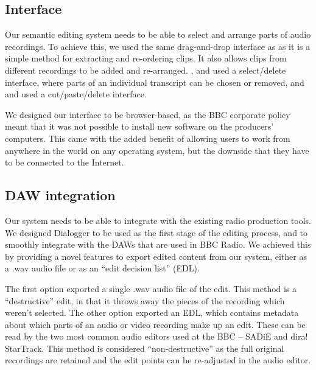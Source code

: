 
\subsection{Interface}

Our semantic editing system needs to be able to select and arrange parts of audio recordings. To achieve this, we used
the same drag-and-drop interface as \citet{Hyperaudio2016} as it is a simple method for extracting and re-ordering
clips. It also allows clips from different recordings to be added and re-arranged. \citet{Casares2002},
\citet{Sivaraman2016} and \citet{Berthouzoz2012} used a select/delete interface, where parts of an individual
transcript can be chosen or removed, and \citet{Whittaker2004} and \citet{Rubin2013} used a cut/paste/delete interface.

We designed our interface to be browser-based, as the BBC corporate policy meant that it was not possible to install
new software on the producers' computers. This came with the added benefit of allowing users to work from anywhere in
the world on any operating system, but the downside that they have to be connected to the Internet.

\subsection{DAW integration}

Our system needs to be able to integrate with the existing radio production tools. We designed Dialogger to be used as
the first stage of the editing process, and to smoothly integrate with the DAWs that are used in BBC Radio. We achieved
this by providing a novel features to export edited content from our system, either as a .wav audio file or as an ``edit
decision list'' (EDL).

The first option exported a single .wav audio file of the edit. This method is a ``destructive'' edit, in that it
throws away the pieces of the recording which weren't selected.  The other option exported an EDL, which contains
metadata about which parts of an audio or video recording make up an edit. These can be read by the two most common
audio editors used at the BBC -- SADiE and dira! StarTrack.  This method is considered ``non-destructive'' as the full
original recordings are retained and the edit points can be re-adjusted in the audio editor.


